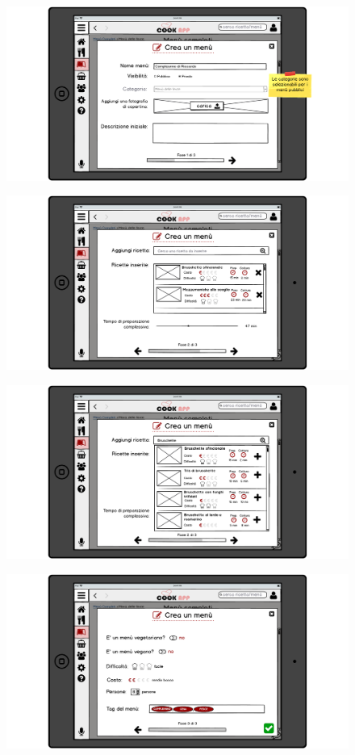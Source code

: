 \begin{figure}[H]
	\centering
	\includegraphics[width=0.95\linewidth]{img/mockup/menu-crea.png}
\end{figure}
\begin{figure}[H]
	\centering
	\includegraphics[width=0.95\linewidth]{img/mockup/menu-crea-2.png}
\end{figure}
\begin{figure}[H]
	\centering
	\includegraphics[width=0.95\linewidth]{img/mockup/menu-crea-3.png}
\end{figure}
\begin{figure}[H]
	\centering
	\includegraphics[width=0.95\linewidth]{img/mockup/menu-crea-4.png}
\end{figure}
